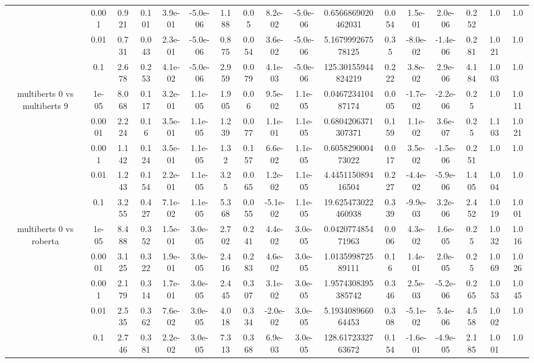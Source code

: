 \begin{tabular}{|c|c|c|c|c|c|c|c|c|c|c|c|c|c|c|c|c|}
 & 0.001 & 0.921 & 0.101 & 3.9e-01 & -5.0e-06 & 1.188 & 0.05 & 8.2e-02 & -5.0e-06 & 0.6566869020462031 & 0.054 & 1.5e-01 & 2.0e-06 & 0.252 & 1.0 & 1.0 \\
 & 0.01 & 0.731 & 0.043 & 2.3e-01 & -5.0e-06 & 0.875 & 0.054 & 3.6e-02 & -5.0e-06 & 5.167999267578125 & 0.35 & -8.0e-02 & -1.4e-06 & 0.281 & 1.021 & 1.0 \\
 & 0.1 & 2.678 & 0.253 & 4.1e-02 & -5.0e-06 & 2.959 & 0.079 & 4.1e-03 & -5.0e-06 & 125.30155944824219 & 0.222 & 3.8e-02 & 2.9e-06 & 4.184 & 1.003 & 1.0 \\
\hline
\multirow{5}{*}{multiberts 0 vs multiberts 9} & 1e-05 & 8.068 & 0.117 & 3.2e-01 & 1.1e-05 & 1.905 & 0.06 & 9.5e-02 & 1.1e-05 & 0.046723410487174 & 0.005 & -1.7e-02 & -2.2e-06 & 0.25 & 1.0 & 1.011 \\
 & 0.0001 & 2.224 & 0.16 & 3.5e-01 & 1.1e-05 & 1.239 & 0.077 & 1.1e-01 & 1.1e-05 & 0.6804206371307371 & 0.159 & 1.1e-02 & 3.6e-07 & 0.25 & 1.103 & 1.021 \\
 & 0.001 & 1.142 & 0.124 & 3.5e-01 & 1.1e-05 & 1.32 & 0.157 & 6.6e-02 & 1.1e-05 & 0.605829000473022 & 0.017 & 3.5e-02 & -1.5e-06 & 0.251 & 1.0 & 1.0 \\
 & 0.01 & 1.243 & 0.154 & 2.2e-01 & 1.1e-05 & 3.25 & 0.065 & 1.2e-02 & 1.1e-05 & 4.445115089416504 & 0.227 & -4.4e-02 & -5.9e-06 & 1.405 & 1.004 & 1.0 \\
 & 0.1 & 3.255 & 0.427 & 7.1e-02 & 1.1e-05 & 5.368 & 0.055 & -5.1e-02 & 1.1e-05 & 19.625473022460938 & 0.339 & -9.9e-03 & 3.2e-06 & 2.452 & 1.019 & 1.001 \\
\hline
\multirow{5}{*}{multiberts 0 vs roberta } & 1e-05 & 8.488 & 0.352 & 1.5e-01 & 3.0e-05 & 2.702 & 0.241 & 4.4e-02 & 3.0e-05 & 0.042077485471963 & 0.006 & 4.3e-02 & 1.6e-05 & 0.25 & 1.032 & 1.016 \\
 & 0.0001 & 3.125 & 0.322 & 1.9e-01 & 3.0e-05 & 2.416 & 0.283 & 4.6e-02 & 3.0e-05 & 1.013599872589111 & 0.16 & 1.4e-01 & 2.0e-05 & 0.25 & 1.069 & 1.026 \\
 & 0.001 & 2.179 & 0.314 & 1.7e-01 & 3.0e-05 & 2.445 & 0.307 & 3.1e-02 & 3.0e-05 & 1.9574308395385742 & 0.346 & 2.5e-03 & -5.2e-06 & 0.265 & 1.053 & 1.045 \\
 & 0.01 & 2.535 & 0.362 & 7.6e-02 & 3.0e-05 & 4.018 & 0.334 & -2.0e-02 & 3.0e-05 & 5.193408966064453 & 0.308 & -5.1e-02 & 5.4e-06 & 4.558 & 1.002 & 1.0 \\
 & 0.1 & 2.746 & 0.381 & 2.2e-02 & 3.0e-05 & 7.313 & 0.368 & 6.9e-03 & 3.0e-05 & 128.6172332763672 & 0.154 & -1.6e-01 & -4.9e-05 & 2.185 & 1.001 & 1.0 \\

\end{tabular}
